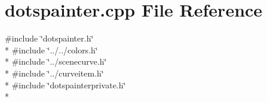 \section{dotspainter.\+cpp File Reference}
\label{bk3_2curve_2painters_2dotspainter_8cpp}
{\ttfamily \#include \char`\"{}dotspainter.\+h\char`\"{}}\\*
{\ttfamily \#include \char`\"{}../../colors.\+h\char`\"{}}\\*
{\ttfamily \#include \char`\"{}../scenecurve.\+h\char`\"{}}\\*
{\ttfamily \#include \char`\"{}../curveitem.\+h\char`\"{}}\\*
{\ttfamily \#include \char`\"{}dotspainterprivate.\+h\char`\"{}}\\*
